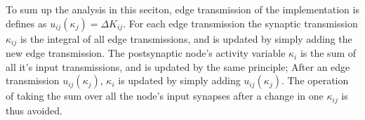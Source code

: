 

			To sum up the analysis in this seciton, edge transmission of the implementation is defines as  $u_{ij}(\kappa_j) = \Delta K_{ij}$.
			For each edge transmission the synaptic transmission $\kappa_{ij}$ is the integral of all edge transmissions, and is updated by simply adding the new edge transmission.
			The postsynaptic node's activity variable $\kappa_i$ is the sum of all it's input transmissions, and is updated by the same principle; %
				After an edge transmission $u_{ij}(\kappa_j)$, $\kappa_i$ is updated by simply adding $u_{ij}(\kappa_j)$. 
			 The operation of taking the sum over all the node's input synapses after a change in one $\kappa_{ij}$ is thus avoided.

			
